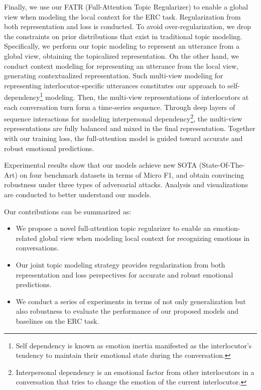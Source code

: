 \documentclass{ecai}
\begin{document}
Finally, we use our FATR (Full-Attention Topic Regularizer) to enable a global view when modeling the local context for the ERC task. Regularization from both representation and loss is conducted. To avoid over-regularization, we drop the constraints on prior distributions that exist in traditional topic modeling. Specifically, we perform our topic modeling to represent an utterance from a global view, obtaining the topicalized representation. On the other hand, we conduct context modeling for representing an utterance from the local view, generating contextualized representation. Such multi-view modeling for representing interlocutor-specific utterances constitutes our approach to self-dependency\footnote{Self dependency is known as emotion inertia manifested as the interlocutor's tendency to maintain their emotional state during the conversation.} modeling. Then, the multi-view representations of interlocutors at each conversation turn form a time-series sequence. Through deep layers of sequence interactions for modeling interpersonal dependency\footnote{Interpersonal dependency is an emotional factor from other interlocutors in a conversation that tries to change the emotion of the current interlocutor.}, the multi-view representations are fully balanced and mixed in the final representation. Together with our training loss, the full-attention model is guided toward accurate and robust emotional predictions. 

Experimental results show that our models achieve new SOTA (State-Of-The-Art) on four benchmark datasets in terms of Micro F1, and obtain convincing robustness under three types of adversarial attacks. Analysis and visualizations are conducted to better understand our models.

Our contributions can be summarized as:
\begin{itemize}
 \item We propose a novel full-attention topic regularizer to enable an emotion-related global view when modeling local context for recognizing emotions in conversations.
 \item Our joint topic modeling strategy provides regularization from both representation and loss perspectives for accurate and robust emotional predictions.
 \item We conduct a series of experiments in terms of not only generalization but also robustness to evaluate the performance of our proposed models and baselines on the ERC task. 
\end{itemize}
\end{document}
